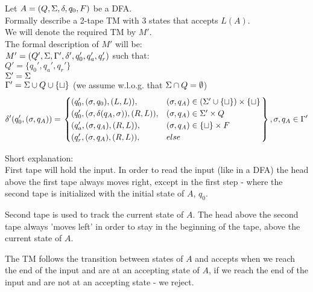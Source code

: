 Let $A = (Q, \Sigma, \delta, q_0, F)$ be a DFA. \\
Formally describe a 2-tape TM with 3 states that accepts $L(A)$. \\

We will denote the required TM by $M'$. \\
The formal description of $M'$ will be: \\
$ M' = (Q', \Sigma, \Gamma', \delta', q_0', q_a', q_r') $ such that: \\
$ Q'      = \{q_0', q_a', q_r'\} $ \\
$ \Sigma'    = \Sigma $ \\
$ \Gamma' = \Sigma \cup Q \cup \{\sqcup\} $ (we assume w.l.o.g. that $\Sigma \cap Q = \emptyset$) \\
\[
    \delta'(q_0', (\sigma, q_A)) = \left.
    \begin{cases}
        (q_0', (\sigma, q_0), (L, L)) ,           & (\sigma, q_A) \in (\Sigma' \cup \{\sqcup\}) \times \{\sqcup\} \\
        (q_0', (\sigma, \delta(q_A, \sigma)), (R, L)) , & (\sigma, q_A) \in \Sigma' \times Q                            \\
        (q_a', (\sigma, q_A), (R, L)),            & (\sigma, q_A) \in \{\sqcup\} \times F                      \\
        (q_r', (\sigma, q_A), (R, L)),            & else                                                    \\
    \end{cases}
    \right\} , \sigma, q_A \in \Gamma' \\
\]

Short explanation: \\
First tape will hold the input. In order to read the input
(like in a DFA) the head above the first tape always moves right,
except in the first step - where the second tape is initialized with
the initial state of $A$, $q_0$.

Second tape is used to track the current state of $A$.
The head above the second tape always 'moves left' in order to
stay in the beginning of the tape, above the current state of $A$.

The TM follows the transition between states of $A$ and accepts
when we reach the end of the input and are at an accepting state of $A$,
if we reach the end of the input and are not at an accepting state - we reject.